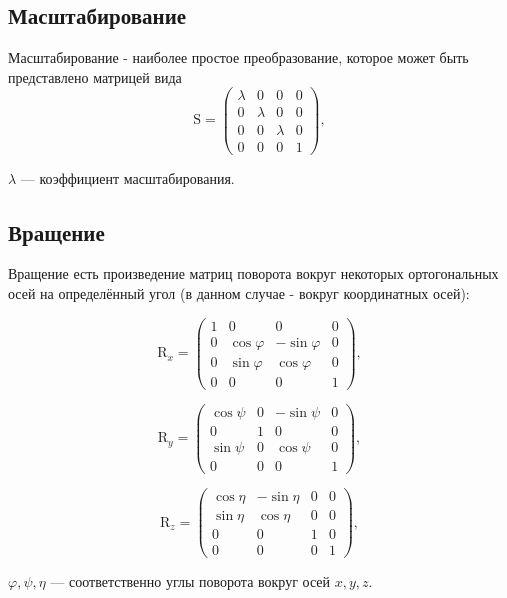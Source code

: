 \subsection{Масштабирование}
Масштабирование - наиболее простое преобразование, которое может быть представлено матрицей вида
\begin{equation}
\mathrm{S} = 
  \begin{pmatrix}
    \lambda & 0 & 0 & 0 \\
    0 & \lambda & 0 & 0 \\
    0 & 0 & \lambda & 0 \\
    0 & 0 & 0 & 1
  \end{pmatrix},
\end{equation}
\begin{eqrem}
\begin{math} \lambda \end{math} --- коэффициент масштабирования.
\end{eqrem}

\subsection{Вращение}
Вращение есть произведение матриц поворота вокруг некоторых ортогональных осей на 
определённый угол (в данном случае - вокруг координатных осей):

\begin{equation}
\mathrm{R}_x = 
  \begin{pmatrix}
    1 & 0  & 0 & 0\\
    0 & \cos\varphi & -\sin\varphi & 0\\
    0 & \sin\varphi & \cos\varphi & 0\\
    0 & 0 & 0 & 1
  \end{pmatrix},
\end{equation}

\begin{equation}
\mathrm{R}_y = 
  \begin{pmatrix}
    \cos\psi  & 0 & -\sin\psi & 0\\
    0 & 1 & 0 & 0 \\
    \sin\psi & 0 & \cos\psi & 0\\
    0 & 0 & 0 & 1
  \end{pmatrix},
\end{equation}

\begin{equation}
\mathrm{R}_z = 
  \begin{pmatrix}
    \cos\eta & -\sin\eta & 0 & 0 \\
    \sin\eta & \cos\eta  & 0 & 0\\
    0 & 0 & 1 & 0\\
    0 & 0 & 0 & 1
  \end{pmatrix},
\end{equation}
\begin{eqrem}
\begin{math} \varphi, \psi, \eta\end{math} --- соответственно углы поворота вокруг осей \begin{math}x, y, z\end{math}.
\end{eqrem}

